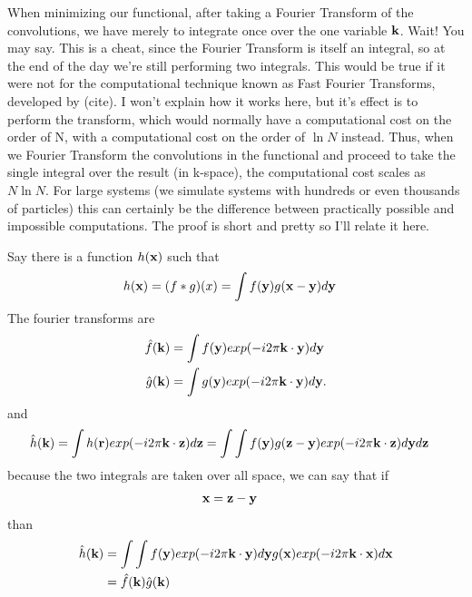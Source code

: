 When minimizing our functional, after
taking a Fourier Transform of the convolutions, we have merely to
integrate once over the one variable $\textbf{k}$.  Wait!  You may say.  This
is a cheat, since the Fourier Transform is itself an integral, so at
the end of the day we're still performing two integrals.  This would
be true if it were not for the computational technique known as Fast
Fourier Transforms, developed by (cite).  I won't explain how it works
here, but it's effect is to perform the transform, which would
normally have a computational cost on the order of N, with a
computational cost on the order of $\ln N$ instead.  Thus, when we
Fourier Transform the convolutions in the functional and proceed to
take the single integral over the result (in k-space), the
computational cost scales as $N \ln N$.  For large systems (we
simulate systems with hundreds or even thousands of particles) this
can certainly be the difference between practically possible and
impossible computations.  The proof is short and pretty so I'll relate
it here.

Say there is a function $h(\textbf{x})$ such that
\begin{align}
  h(\textbf{x}) &= (f\ast g)(x) = \int f(\textbf{y})g(\textbf{x}-\textbf{y})d\textbf{y}
\end{align}
The fourier transforms are
\begin{align}
  \hat{f}(\textbf{k}) &= \int f(\textbf{y}) exp(-i2\pi \textbf{k} \cdot \textbf{y})d\textbf{y} \\
  \hat{g}(\textbf{k}) &= \int g(\textbf{y}) exp(-i2\pi \textbf{k} \cdot \textbf{y})d\textbf{y}.
\end{align}
and
\begin{align}
  \hat{h}(\textbf{k}) = \int h(\textbf{r}) exp(-i2\pi \textbf{k} \cdot \textbf{z}) d\textbf{z} &= \int \int f(\textbf{y}) g(\textbf{z}-\textbf{y}) exp(-i2\pi \textbf{k} \cdot \textbf{z}) d\textbf{y} d\textbf{z}
\end{align}
because the two integrals are taken over all space, we can say that if
\begin{align}
\textbf{x} &= \textbf{z} - \textbf{y}
\end{align}
than
\begin{align}
\hat{h}(\textbf{k}) &= \int \int f(\textbf{y}) exp(-i2\pi \textbf{k} \cdot \textbf{y} ) d\textbf{y} g(\textbf{x}) exp(-i2\pi \textbf{k} \cdot \textbf{x}) d\textbf{x} \\
&= \hat{f}(\textbf{k}) \hat{g}(\textbf{k})
\end{align}


